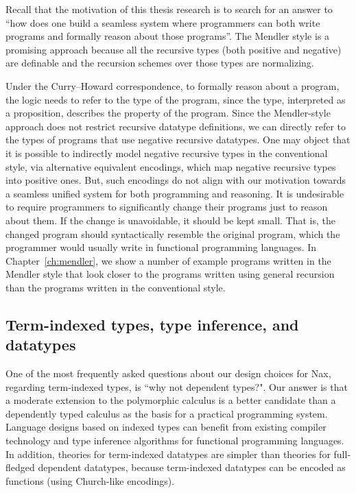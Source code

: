 Recall that the motivation of this thesis research is to search for
an answer to ``how does one build a seamless system where programmers
can both write programs and formally reason about those programs''.
The Mendler style is a promising approach because all the recursive types
(both positive and negative) are definable and the recursion schemes over
those types are normalizing.

Under the Curry--Howard correspondence, to formally reason about a program,
the logic needs to refer to the type of the program, since the type,
interpreted as a proposition, describes the property of the program.
Since the Mendler-style approach does not restrict recursive datatype
definitions, we can directly refer to the types of programs that use
negative recursive datatypes. One may object that it is possible to
indirectly model negative recursive types in the conventional style,
via alternative equivalent encodings, which map negative recursive types
into positive ones. But, such encodings do not align with our motivation
towards a seamless unified system for both programming and reasoning.
It is undesirable to require programmers to significantly change their
programs just to reason about them. If the change is unavoidable, it should
be kept small. That is, the changed program should syntactically resemble
the original program, which the programmer would usually write in
functional programming languages. In Chapter~\ref{ch:mendler},
we show a number of example programs written in the Mendler style
that look closer to the programs written using general recursion
than the programs written in the conventional style.

\subsection{Term-indexed types, type inference, and datatypes}
\label{sec:intro:concepts:indexed}
One of the most frequently asked questions about our design choices for Nax,
regarding term-indexed types, is ``why not dependent types?". Our answer
is that a moderate extension to the polymorphic calculus is a better candidate
than a dependently typed calculus as the basis for a practical programming
system.  Language designs based on indexed types can
benefit from existing compiler technology and type inference algorithms
for functional programming languages. In addition, theories for
term-indexed datatypes are simpler than theories for full-fledged
dependent datatypes, because term-indexed datatypes can be encoded as
functions (using Church-like encodings).

